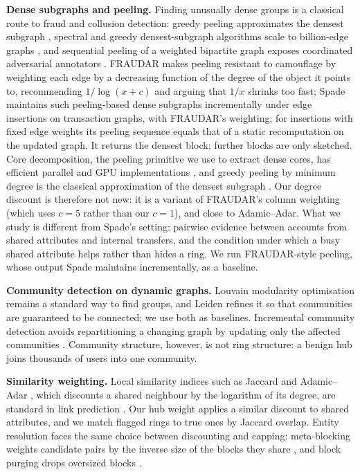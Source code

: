 \textbf{Dense subgraphs and peeling.} Finding unusually dense groups is a
classical route to fraud and collusion detection: greedy peeling approximates
the densest subgraph \cite{charikar2000greedy}, spectral and greedy
densest-subgraph algorithms scale to billion-edge graphs \cite{feng2024unified},
and sequential peeling of a weighted bipartite graph exposes coordinated
adversarial annotators \cite{karaaslanli2025crowd}. FRAUDAR
\cite{hooi2016fraudar} makes peeling resistant to camouflage by weighting each
edge by a decreasing function of the degree of the object it points to,
recommending $1/\log(x+c)$ and arguing that $1/x$ shrinks too fast; Spade
\cite{jiang2022spade} maintains such peeling-based dense subgraphs
incrementally under edge insertions on transaction graphs, with FRAUDAR's
weighting; for insertions with fixed edge weights its peeling sequence equals
that of a static recomputation on the updated graph. It returns the densest
block; further blocks are only sketched. Core
decomposition, the peeling primitive we use to extract dense cores, has
efficient parallel and GPU implementations \cite{ahmad2023gpukcore,li2021graphblas},
and greedy peeling by minimum degree is the classical approximation of the
densest subgraph \cite{charikar2000greedy}. Our degree discount is therefore
not new: it is a variant of FRAUDAR's column weighting (which uses $c=5$
rather than our $c=1$), and close to Adamic--Adar. What we
study is different from Spade's setting: pairwise evidence between accounts
from shared attributes and internal transfers, and the condition under which a
busy shared attribute helps rather than hides a ring. We run FRAUDAR-style
peeling, whose output Spade maintains incrementally, as a baseline.

\textbf{Community detection on dynamic graphs.} Louvain modularity optimisation
\cite{blondel2008louvain} remains a standard way to find groups, and Leiden
\cite{traag2019leiden} refines it so that communities are guaranteed to be
connected; we use both as baselines. Incremental community
detection avoids repartitioning a changing graph by updating only the
affected communities \cite{zhang2026incremental,abughofa2021incremental}.
Community structure, however, is not ring structure: a benign hub joins
thousands of users into one community.

\textbf{Similarity weighting.} Local similarity indices such as Jaccard and
Adamic--Adar \cite{adamic2003friends}, which discounts a shared neighbour by
the logarithm of its degree, are standard in link prediction
\cite{libennowell2007link}. Our hub weight applies a similar discount to shared
attributes, and we match flagged rings to true ones by Jaccard overlap. Entity
resolution faces the same choice between discounting and capping: meta-blocking
weights candidate pairs by the inverse size of the blocks they share
\cite{papadakis2014metablocking}, and block purging drops oversized blocks
\cite{papadakis2013blocking}.

